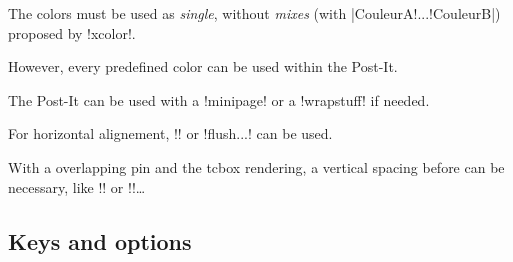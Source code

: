 \documentclass[english,a4paper,11pt]{article}
\begin{document}
\begin{DemoCode}[]
\begin{PostItNote}[Render=tikz]
\lipsum[1][1-2]
\end{PostItNote}
\begin{PostItNote}[Render=tikzv2]
\lipsum[1][1-2]
\end{PostItNote}
\end{DemoCode}

\begin{tipblock}
The colors must be used as \textit{single}, without \textit{mixes} (with \motcletex|CouleurA!...!CouleurB|) proposed by \packagetex!xcolor!. 


However, every predefined color can be used within the Post-It.
\end{tipblock}

\begin{tipblock}
The Post-It can be used with a \motcletex!minipage! or a \motcletex!wrapstuff! if needed.

For horizontal alignement, \motcletex!\hfill! or \motcletex!flush...! can be used.
\end{tipblock}

\begin{warningblock}
With a overlapping pin and the \textsf{tcbox} rendering, a vertical spacing before can be necessary, like \motcletex!\vspace! or \motcletex!\bigskip!\ldots
\end{warningblock}

\subsection{Keys and options}
\end{document}
